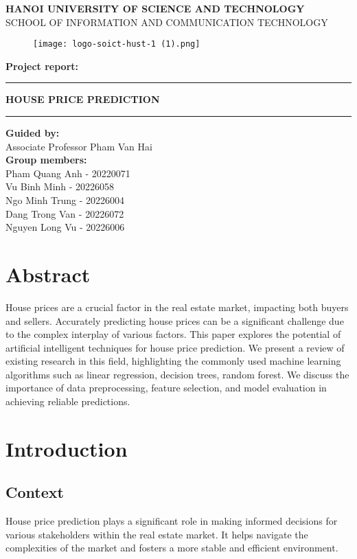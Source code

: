 \documentclass[a4paper, 12pt]{article}
\begin{document}
\begin{center}
    \textbf{\large{HANOI UNIVERSITY OF SCIENCE AND TECHNOLOGY}}\\[10pt]
    \small{SCHOOL OF INFORMATION AND COMMUNICATION TECHNOLOGY}
\end{center}
\begin{figure}[tbh]
    \centering
    \texttt{[image: logo-soict-hust-1 (1).png]}
\end{figure}
\begin{center}
    \textbf{Project report:}
\end{center}
\rule{\textwidth}{0.5pt}
\begin{center}
    \textbf{\large{HOUSE PRICE PREDICTION}}
\end{center}
\rule{\textwidth}{0.5pt}
\begin{center}
    \textbf{Guided by:}\\[10pt]
    Associate Professor Pham Van Hai\\[20pt]
    \textbf{Group members:}\\[10pt]
    Pham Quang Anh - 20220071\\[10pt]
    Vu Binh Minh - 20226058\\[10pt]
    Ngo Minh Trung - 20226004\\[10pt]
    Dang Trong Van - 20226072\\[10pt]
    Nguyen Long Vu - 20226006\\[10pt]
\end{center}
\newpage
\tableofcontents
\newpage
\section*{Abstract}
House prices are a crucial factor in the real estate market, impacting both buyers and sellers. Accurately predicting house prices can be a significant challenge due to the complex interplay of various factors. This paper explores the potential of artificial intelligent techniques for house price prediction. We present a review of existing research in this field, highlighting the commonly used machine learning algorithms such as linear regression, decision trees, random forest. We discuss the importance of data preprocessing, feature selection, and model evaluation in achieving reliable predictions.
\section{Introduction}
\subsection{Context}
House price prediction plays a significant role in making informed decisions for various stakeholders within the real estate market. It helps navigate the complexities of the market and fosters a more stable and efficient environment.
\end{document}
